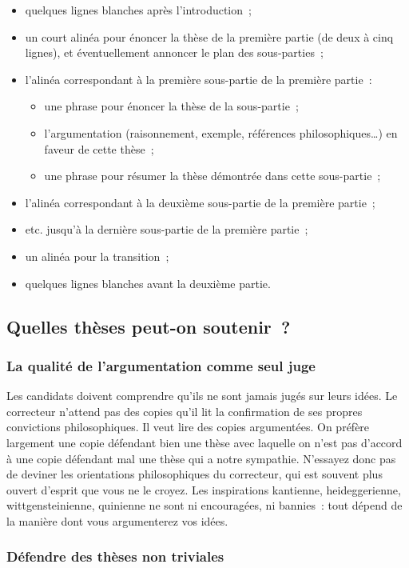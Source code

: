 \documentclass[a4paper]{article}
\begin{document}
\begin{itemize}
\item quelques lignes blanches après l'introduction ;
\item un court alinéa pour énoncer la thèse de la première partie (de deux à
  cinq lignes), et éventuellement annoncer le plan des sous-parties ;
\item l'alinéa correspondant à la première sous-partie de la première partie :
\begin{itemize}
\item une phrase pour énoncer la thèse de la sous-partie ;
\item l'argumentation (raisonnement, exemple, références
    philosophiques\ldots{}) en faveur de cette thèse ;
\item une phrase pour résumer la thèse démontrée dans cette sous-partie ;
\end{itemize}
\item l'alinéa correspondant à la deuxième sous-partie de la première
  partie ;
\item etc. jusqu'à la dernière sous-partie de la première partie ;
\item un alinéa pour la transition ;
\item quelques lignes blanches avant la deuxième partie.
\end{itemize}
\subsection{Quelles thèses peut-on soutenir ?}
\label{sec-3-2}
\subsubsection{La qualité de l'argumentation comme seul juge}
\label{sec-3-2-1}


Les candidats doivent comprendre qu'ils ne sont jamais jugés sur leurs
idées. Le correcteur n'attend pas des copies qu'il lit la confirmation
de ses propres convictions philosophiques. Il veut lire des copies
argumentées. On préfère largement une copie défendant bien une thèse
avec laquelle on n'est pas d'accord à une copie défendant mal une thèse
qui a notre sympathie. N'essayez donc pas de deviner les orientations
philosophiques du correcteur, qui est souvent plus ouvert d'esprit que
vous ne le croyez. Les inspirations kantienne, heideggerienne,
wittgensteinienne, quinienne ne sont ni encouragées, ni bannies : tout
dépend de la manière dont vous argumenterez vos idées.
\subsubsection{Défendre des thèses non triviales}
\label{sec-3-2-2}
\end{document}
